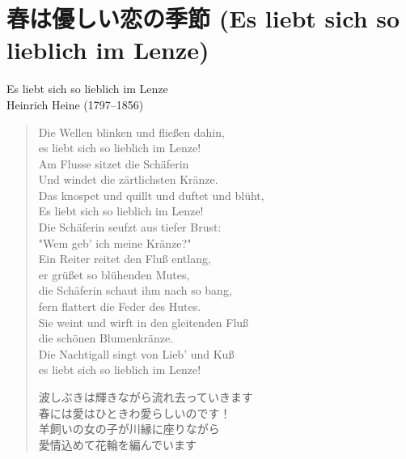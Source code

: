 
\section{春は優しい恋の季節 (Es liebt sich so lieblich im Lenze)}

\begin{center}
	{\large Es liebt sich so lieblich im Lenze}\\
	\hspace*{25truemm}Heinrich Heine (1797--1856)
\end{center}
\begin{quote}
\begin{multicols}{2}
	Die Wellen blinken und flie{\ss}en dahin, \\
	es liebt sich so lieblich im Lenze! \\
	Am Flusse sitzet die Sch{\"a}ferin \\
	Und windet die z\"artlichsten Kr\"anze. \\

	Das knospet und quillt und duftet und bl{\"u}ht, \\
	Es liebt sich so lieblich im Lenze! \\
	Die Sch{\"a}ferin seufzt aus tiefer Brust: \\
	"Wem geb' ich meine Kr{\"a}nze?" \\

	Ein Reiter reitet den Flu{\ss} entlang, \\
	er gr\"u{\ss}et so bl{\"u}henden Mutes, \\
	die Sch{\"a}ferin schaut ihm nach so bang, \\
	fern flattert die Feder des Hutes. \\

	Sie weint und wirft in den gleitenden Flu\ss \\
	die sch{\"o}nen Blumenkr{\"a}nze. \\
	Die Nachtigall singt von Lieb' und Ku\ss \\
	es liebt sich so lieblich im Lenze!

	波しぶきは輝きながら流れ去っていきます \\
	春には愛はひときわ愛らしいのです！ \\
	羊飼いの女の子が川縁に座りながら \\
	愛情込めて花輪を編んでいます \\


\end{multicols}
\end{quote}
